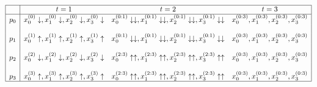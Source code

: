 \[
\begin{array}{|c|ccc|}
\hline
  &t=1&t=2&t=3\\ \hline
p_0&x_0^{(0)}\downarrow,x_1^{(0)}\downarrow,x_2^{(0)}\downarrow,x_3^{(0)}\downarrow
    &x_0^{(0:1)}\downarrow\downarrow,x_1^{(0:1)}\downarrow\downarrow,x_2^{(0:1)}\downarrow\downarrow,x_3^{(0:1)}\downarrow\downarrow
    &x_0^{(0:3)},x_1^{(0:3)},x_2^{(0:3)},x_3^{(0:3)}\\
    &&&\\
p_1&x_0^{(1)}\uparrow,x_1^{(1)}\uparrow,x_2^{(1)}\uparrow,x_3^{(1)}\uparrow
    &x_0^{(0:1)}\downarrow\downarrow,x_1^{(0:1)}\downarrow\downarrow,x_2^{(0:1)}\downarrow\downarrow,x_3^{(0:1)}\downarrow\downarrow
    &x_0^{(0:3)},x_1^{(0:3)},x_2^{(0:3)},x_3^{(0:3)}\\
    &&&\\
p_2&x_0^{(2)}\downarrow,x_1^{(2)}\downarrow,x_2^{(2)}\downarrow,x_3^{(2)}\downarrow
    &x_0^{(2:3)}\uparrow\uparrow,x_1^{(2:3)}\uparrow\uparrow,x_2^{(2:3)}\uparrow\uparrow,x_3^{(2:3)}\uparrow\uparrow
    &x_0^{(0:3)},x_1^{(0:3)},x_2^{(0:3)},x_3^{(0:3)}\\
    &&&\\
p_3&x_0^{(3)}\uparrow,x_1^{(3)}\uparrow,x_2^{(3)}\uparrow,x_3^{(3)}\uparrow
    &x_0^{(2:3)}\uparrow\uparrow,x_1^{(2:3)}\uparrow\uparrow,x_2^{(2:3)}\uparrow\uparrow,x_3^{(2:3)}\uparrow\uparrow
    &x_0^{(0:3)},x_1^{(0:3)},x_2^{(0:3)},x_3^{(0:3)}\\
\hline
\end{array}
\]

